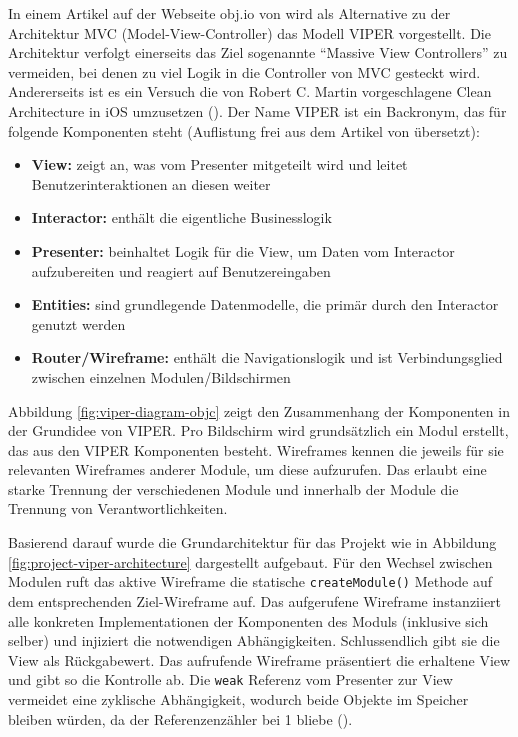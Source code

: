 In einem Artikel auf der Webseite obj.io von \cite{viper-objcio} wird als Alternative zu der Architektur MVC (Model-View-Controller) das Modell VIPER vorgestellt.
Die Architektur verfolgt einerseits das Ziel sogenannte "`Massive View Controllers"' zu vermeiden, bei denen zu viel Logik in die Controller von MVC gesteckt wird.
Andererseits ist es ein Versuch die von Robert C. Martin vorgeschlagene Clean Architecture in iOS umzusetzen (\cite{clean-architecture}).
Der Name VIPER ist ein Backronym, das für folgende Komponenten steht (Auflistung frei aus dem Artikel von \cite{viper-objcio} übersetzt):

\begin{itemize}
	\item \textbf{View:} zeigt an, was vom Presenter mitgeteilt wird und leitet Benutzerinteraktionen an diesen weiter
	\item \textbf{Interactor:} enthält die eigentliche Businesslogik
	\item \textbf{Presenter:} beinhaltet Logik für die View, um Daten vom Interactor aufzubereiten und reagiert auf Benutzereingaben
	\item \textbf{Entities:} sind grundlegende Datenmodelle, die primär durch den Interactor genutzt werden
	\item \textbf{Router/Wireframe:} enthält die Navigationslogik und ist Verbindungsglied zwischen einzelnen Modulen/Bildschirmen
\end{itemize}


Abbildung \ref{fig:viper-diagram-objc} zeigt den Zusammenhang der Komponenten in der Grundidee von VIPER.
Pro Bildschirm wird grundsätzlich ein Modul erstellt, das aus den VIPER Komponenten besteht.
Wireframes kennen die jeweils für sie relevanten Wireframes anderer Module, um diese aufzurufen.
Das erlaubt eine starke Trennung der verschiedenen Module und innerhalb der Module die Trennung von Verantwortlichkeiten.

Basierend darauf wurde die Grundarchitektur für das Projekt wie in Abbildung \ref{fig:project-viper-architecture} dargestellt aufgebaut.
Für den Wechsel zwischen Modulen ruft das aktive Wireframe die statische \texttt{createModule()} Methode auf dem entsprechenden Ziel-Wireframe auf.
Das aufgerufene Wireframe instanziiert alle konkreten Implementationen der Komponenten des Moduls (inklusive sich selber) und injiziert die notwendigen Abhängigkeiten.
Schlussendlich gibt sie die View als Rückgabewert.
Das aufrufende Wireframe präsentiert die erhaltene View und gibt so die Kontrolle ab.
Die \texttt{weak} Referenz vom Presenter zur View vermeidet eine zyklische Abhängigkeit, wodurch beide Objekte im Speicher bleiben würden, da der Referenzenzähler bei 1 bliebe (\cite{automatic-reference-counting}).

